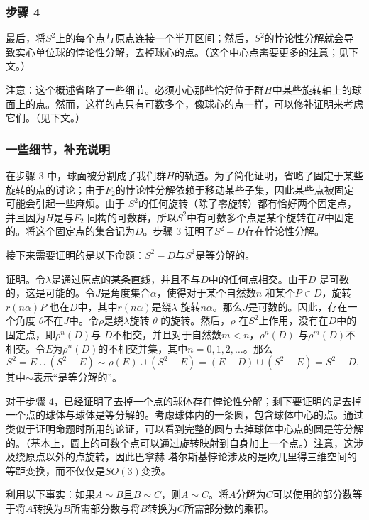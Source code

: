 \subsubsection{步骤 4}  
最后，将\( S^2 \)上的每个点与原点连接一个半开区间；然后，\( S^2 \)的悖论性分解就会导致实心单位球的悖论性分解，去掉球心的点。（这个中心点需要更多的注意；见下文。）

注意：这个概述省略了一些细节。必须小心那些恰好位于群\( H \)中某些旋转轴上的球面上的点。然而，这样的点只有可数多个，像球心的点一样，可以修补证明来考虑它们。（见下文。）
\subsubsection{一些细节，补充说明}  
在步骤 3 中，球面被分割成了我们群\( H \)的轨道。为了简化证明，省略了固定于某些旋转的点的讨论；由于\( F_2 \)的悖论性分解依赖于移动某些子集，因此某些点被固定可能会引起一些麻烦。由于 \( S^2 \)的任何旋转（除了零旋转）都有恰好两个固定点，并且因为\( H \)是与\( F_2 \) 同构的可数群，所以\( S^2 \)中有可数多个点是某个旋转在\( H \)中固定的。将这个固定点的集合记为\( D \)。步骤 3 证明了\( S^2 - D \)存在悖论性分解。

接下来需要证明的是以下命题：\( S^2 - D \)与\( S^2 \)是等分解的。

证明。令\( \lambda \)是通过原点的某条直线，并且不与\( D \)中的任何点相交。由于\( D \) 是可数的，这是可能的。令\( J \)是角度集合\( \alpha \)，使得对于某个自然数\( n \) 和某个\( P \in D \)，旋转\( r(n\alpha)P \) 也在\( D \)中，其中\( r(n\alpha) \)是绕\( \lambda \) 旋转\( n\alpha \)。那么\( J \)是可数的。因此，存在一个角度 \( \theta\)不在\( J \)中。令\( \rho \)是绕\( \lambda \)旋转 \( \theta \) 的旋转。然后，\( \rho \) 在\( S^2 \)上作用，没有在\( D \)中的固定点，即\( \rho^n(D) \)与 \( D \)不相交，并且对于自然数\( m < n \)，\( \rho^n(D) \) 与\( \rho^m(D) \)不相交。令\( E \)为\( \rho^n(D) \)的不相交并集，其中\( n = 0, 1, 2, \dots \)。那么  
\[
S^2 = E \cup (S^2 - E) \sim \rho(E) \cup (S^2 - E) = (E - D) \cup (S^2 - E) = S^2 - D,~
\]
其中\( \sim \)表示“是等分解的”。

对于步骤 4，已经证明了去掉一个点的球体存在悖论性分解；剩下要证明的是去掉一个点的球体与球体是等分解的。考虑球体内的一条圆，包含球体中心的点。通过类似于证明命题时所用的论证，可以看到完整的圆与去掉球体中心点的圆是等分解的。（基本上，圆上的可数个点可以通过旋转映射到自身加上一个点。）注意，这涉及绕原点以外的点旋转，因此巴拿赫-塔尔斯基悖论涉及的是欧几里得三维空间的等距变换，而不仅仅是\( SO(3) \)变换。

利用以下事实：如果\( A \sim B \)且\( B \sim C \)，则\( A \sim C \)。将\( A \)分解为\( C \)可以使用的部分数等于将\( A \)转换为\( B \)所需部分数与将\( B \)转换为\( C \)所需部分数的乘积。

